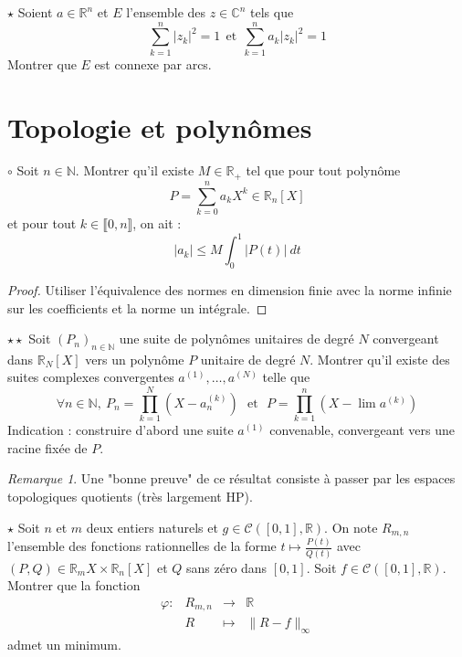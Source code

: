 \documentclass[french,a4paper]{article}
\newcommand{\N}{\mathbb{N}}
\newcommand{\R}{\mathbb{R}}
\newcommand{\C}{\mathbb{C}}
\theoremstyle{plain}
\theoremstyle{definition}
\theoremstyle{remark}
\newtheorem*{rmq}{Remarque}
\begin{document}
\begin{ex}{$\star$}
	Soient $a\in\R^n$ et $E$ l'ensemble des $z\in\C^n$ tels que $$\sum_{k=1}^{n}\lvert z_k\rvert^2=1\ \ \text{et}\ \ \sum_{k=1}^{n}a_k\lvert z_k\rvert^2=1$$ Montrer que $E$ est connexe par arcs.
\end{ex}

\section{Topologie et polynômes}

\begin{ex}{$\circ$}
	Soit $n\in\N$. Montrer qu'il existe $M\in\R_+$ tel que pour tout polynôme $$P=\sum_{k=0}^{n}a_kX^k\in\R_n[X]$$ et pour tout $k\in\llbracket0,n\rrbracket$, on ait : $$\lvert a_k\rvert\leqslant M\int_{0}^{1}\lvert P(t)\rvert\ dt$$
\end{ex}
\begin{proof}
	Utiliser l'équivalence des normes en dimension finie avec la norme infinie sur les coefficients et la norme un intégrale.
\end{proof}

\begin{ex}{$\star\star$}
	Soit $(P_n)_{n\in\N}$ une suite de polynômes unitaires de degré $N$ convergeant dans $\R_N[X]$ vers un polynôme $P$ unitaire de degré $N$. Montrer qu'il existe des suites complexes convergentes $a^{(1)},\ldots,a^{(N)}$ telle que $$\forall n\in\N,\ P_n=\prod_{k=1}^{N}(X-a_n^{(k)}) \ \ \ \text{et} \ \ \ P=\prod_{k=1}^{n}(X-\lim a^{(k)})$$ Indication : construire d'abord une suite $a^{(1)}$ convenable, convergeant vers une racine fixée de $P$.
\end{ex}
\begin{rmq}
	Une "bonne preuve" de ce résultat consiste à passer par les espaces topologiques quotients (très largement HP).
\end{rmq}

\begin{ex}{$\star$}
	Soit $n$ et $m$ deux entiers naturels et $g\in\mathcal{C}([0,1],\R)$. On note $R_{m,n}$ l'ensemble des fonctions rationnelles de la forme $\displaystyle t\mapsto \frac{P(t)}{Q(t)}$ avec $(P,Q)\in\R_m{X}\times\R_n[X]$ et $Q$ sans zéro dans $[0,1]$. Soit $f\in\mathcal{C}([0,1],\R)$. Montrer que la fonction $$\begin{array}{lrcl}
		\varphi:&R_{m,n}&\longrightarrow&\R \\
		&R&\longmapsto&\lVert R-f\rVert_\infty
	\end{array}$$ admet un minimum.
\end{ex}
\end{document}

